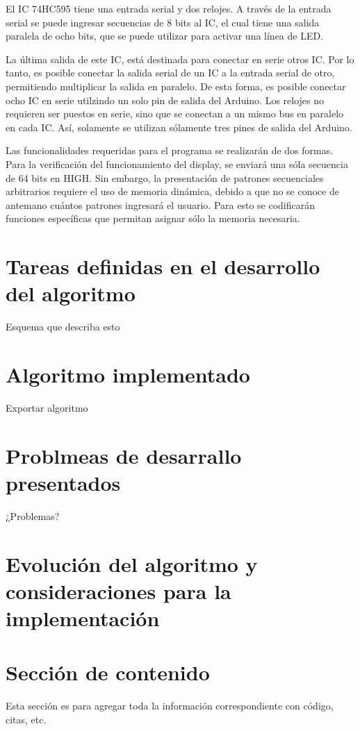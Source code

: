 \documentclass{article}
\begin{document}
El IC 74HC595 tiene una entrada serial y dos relojes. A través de la entrada serial se puede ingresar secuencias de 8 bits al IC, el cual  tiene una salida paralela de ocho bits, que se puede utilizar para activar una línea de LED.

La última salida de este IC, está destinada para conectar en serie otros IC. Por lo tanto, es posible conectar la salida serial de un IC a la entrada serial de otro, permitiendo multiplicar la salida en paralelo. De esta forma, es posible conectar ocho IC en serie utilzindo un solo pin de salida del Arduino. 
Los relojes no requieren ser puestos en serie, sino que se conectan a un mismo bus en paralelo en cada IC. Así, solamente se utilizan sólamente tres pines de salida del Arduino.

Las funcionalidades requeridas para el programa se realizarán de dos formas. Para la verificación del funcionamiento del display, se enviará una sóla secuencia de 64 bits en HIGH. Sin embargo, la presentación de patrones secuenciales arbitrarios requiere el uso de memoria dinámica, debido a que no se conoce de antemano cuántos patrones ingresará el usuario. Para esto se codificarán funciones específicas que permitan asignar sólo la memoria necesaria.

\section{Tareas definidas en el desarrollo del algoritmo}

Esquema que describa esto

\section{Algoritmo implementado}

Exportar algoritmo

\section{Problmeas de desarrallo presentados}

¿Problemas?

\section{Evolución del algoritmo y consideraciones para la implementación}



\section{Sección de contenido} \label{contenido}
Esta sección es para agregar toda la información correspondiente con código, citas, etc.
\end{document}
